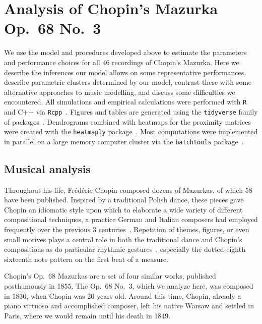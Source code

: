 \documentclass[aoas]{imsart}
\begin{document}
\section{Analysis of Chopin's Mazurka Op.\ 68 No.\ 3}
\label{sec:analys-chop-mazurka}

We use the model and procedures developed above to estimate the
parameters and performance choices for all 46 recordings of Chopin's
Mazurka. Here we describe the inferences our model allows on some
representative performances, describe parametric clusters determined
by our model, contrast these with some alternative approaches to music
modelling, and discuss some difficulties we encountered. All simulations and empirical calculations were performed with
\texttt{R}~\citep{R-Core-Team2019} and C++ via \texttt{Rcpp}~\citep{Eddelbuettel2013}. Figures and tables are generated
using the \texttt{tidyverse} family of
packages~\citep{Wickham2017, Wickham2016}. Dendrograms combined with
heatmaps for the proximity matrices were created with the
\texttt{heatmaply} package~\citep{GaliliOCallaghan2017}.
Most
computations were implemented in parallel on a
large
memory computer cluster via
the \texttt{batchtools} package~\citep{LangBischl2017}. 

\subsection{Musical analysis}
\label{sec:musical-analysis}

Throughout his life, Fr\'ed\'eric Chopin composed dozens of Mazurkas,
of which 58 have been published. Inspired by a traditional Polish
dance, these pieces gave Chopin an idiomatic style upon which to
elaborate a wide variety of different compositional techniques, a
practice German and Italian composers had employed frequently over the previous 3
centuries~\citep{BurkholderGrout2014}. Repetition of themes, figures, or even small motives plays
a central role in both the traditional dance and Chopin's compositions
as do particular rhythmic gestures~\citep{Kallberg1996}, especially the
dotted-eighth sixteenth note pattern on the first beat of a measure. 

Chopin's Op.\ 68 Mazurkas are a set of four similar works, published
posthumously in 1855. The Op.\ 68 No.\ 3, which we analyze here, was
composed in 1830, when Chopin was 20 years old. Around this time,
Chopin, already a piano virtuoso and accomplished composer, left his
native Warsaw and settled in Paris, where we would remain until his
death in 1849.
\end{document}
